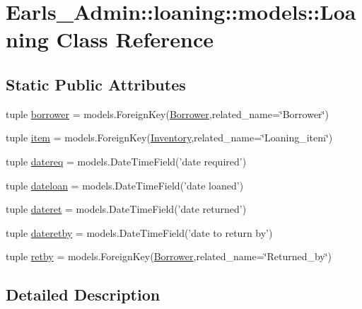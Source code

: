 \hypertarget{classEarls__Admin_1_1loaning_1_1models_1_1Loaning}{
\section{Earls\_\-Admin::loaning::models::Loaning Class Reference}
\label{classEarls__Admin_1_1loaning_1_1models_1_1Loaning}
}
\subsection*{Static Public Attributes}
\begin{CompactItemize}
\item 
tuple \hyperlink{classEarls__Admin_1_1loaning_1_1models_1_1Loaning_4fd2a1f45e68469f39f3e387cb53d8d3}{borrower} = models.ForeignKey(\hyperlink{classEarls__Admin_1_1loaning_1_1models_1_1Borrower}{Borrower},related\_\-name=\char`\"{}Borrower\char`\"{})
\item 
tuple \hyperlink{classEarls__Admin_1_1loaning_1_1models_1_1Loaning_ee09502420d30136aa50f6419000b8ba}{item} = models.ForeignKey(\hyperlink{classEarls__Admin_1_1loaning_1_1models_1_1Inventory}{Inventory},related\_\-name=\char`\"{}Loaning\_\-item\char`\"{})
\item 
tuple \hyperlink{classEarls__Admin_1_1loaning_1_1models_1_1Loaning_f0f7ea4797359ee90acc09c7063e6ff0}{datereq} = models.DateTimeField('date required')
\item 
tuple \hyperlink{classEarls__Admin_1_1loaning_1_1models_1_1Loaning_cbb5db0c7955589338762081381e174c}{dateloan} = models.DateTimeField('date loaned')
\item 
tuple \hyperlink{classEarls__Admin_1_1loaning_1_1models_1_1Loaning_0553958dceb007b5cfe6618a69491081}{dateret} = models.DateTimeField('date returned')
\item 
tuple \hyperlink{classEarls__Admin_1_1loaning_1_1models_1_1Loaning_94a6a7787d70181e0d74b237d0c7bd8b}{dateretby} = models.DateTimeField('date to return by')
\item 
tuple \hyperlink{classEarls__Admin_1_1loaning_1_1models_1_1Loaning_0f03fc941e45181b1c0ce8a51370e924}{retby} = models.ForeignKey(\hyperlink{classEarls__Admin_1_1loaning_1_1models_1_1Borrower}{Borrower},related\_\-name=\char`\"{}Returned\_\-by\char`\"{})
\end{CompactItemize}


\subsection{Detailed Description}


